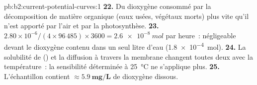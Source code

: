 \begin{solution}{pb:b2:current-potential-curves:1}
\textbf{22.} Du dioxygène consommé par la décomposition de matière organique (eaux usées, végétaux morts)
plus vite qu'il n'est apporté par l'air et par la photosynthèse.
\textbf{23.} $2.80 \times 10^{-6}/(4 \times 96\,485) \times 3600 = \qty{2.6e-8}{mol}$
par heure~: négligeable devant le dioxygène contenu dans un seul litre d'eau
(\qty{1.8e-4}{mol}).
\textbf{24.} La solubilité de  () et la diffusion
à travers la membrane changent toutes deux avec la température~: la sensibilité déterminée à
\qty{25}{\degreeCelsius} ne s'applique plus.
\textbf{25.} L'échantillon contient $\boldsymbol{\approx \qty{5.9}{mg/L}}$ de dioxygène
dissous.
\end{solution}
